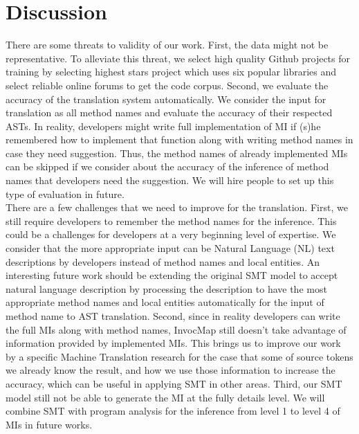 \section*{Discussion}
There are some threats to validity of our work. First, the data might not be representative. To alleviate this threat, we select high quality Github projects for training by selecting highest stars project which uses six popular libraries and select reliable online forums to get the code corpus.  Second, we evaluate the accuracy of the translation system automatically. We consider the input for translation as all method names and evaluate the accuracy of their respected ASTs. In reality, developers might write full implementation of MI if (s)he remembered how to implement that function along with writing method names in case they need suggestion. Thus, the method names of already implemented MIs can be skipped if we consider about the accuracy of the inference of method names that developers need the suggestion. We will hire people to set up this type of evaluation in future.\\
There are a few challenges that we need to improve for the translation. First, we still require developers to remember the method names for the inference. This could be a challenges for developers at a very beginning level of expertise. We consider that the more appropriate input can be Natural Language (NL) text descriptions by developers instead of method names and local entities. An interesting future work should be extending the original SMT model to accept natural language description by processing the description to have the most appropriate method names and local entities automatically for the input of method name to AST translation.  Second, since in reality developers can write the full MIs along with method names, InvocMap still doesn't take advantage of information provided by implemented MIs. This brings us to improve our work by a specific Machine Translation research for the case that some of source tokens we already know the result, and how we use those information to increase the accuracy, which can be useful  in applying SMT in other areas. Third, our SMT model still not be able to generate the MI at the fully details level. We will combine SMT with program analysis for the inference from level 1 to level 4 of MIs in future works. 
